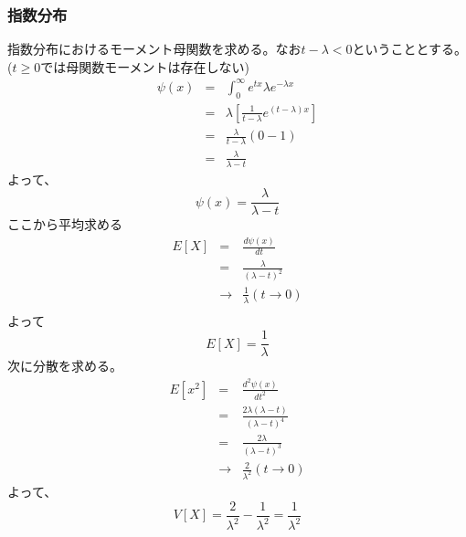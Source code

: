 \documentclass[a4paper,10pt]{jarticle}
\begin{document}
\subsubsection{指数分布}

指数分布におけるモーメント母関数を求める。なお$t-\lambda <0$ということとする。($t\geq 0$では母関数モーメントは存在しない)
\begin{eqnarray*}
    \psi(x) &=&\int_0^\infty e^{tx}\lambda e^{-\lambda x}\\
    &=& \lambda\left[\frac{1}{t-\lambda}e^{(t-\lambda)x}\right]\\
    &=& \frac{\lambda}{t-\lambda}(0-1)\\
    &=& \frac{\lambda}{\lambda - t}
\end{eqnarray*}
よって、
\begin{equation}
    \psi(x)  = \frac{\lambda}{\lambda - t}\tag{3,32}
\end{equation}
ここから平均求める
\begin{eqnarray*}
    E[X] &=& \frac{d\psi(x)}{dt}\\
    &=& \frac{\lambda}{(\lambda-t)^2}\\
    &\rightarrow&\frac{1}{\lambda}(t\rightarrow 0)\\
\end{eqnarray*}
よって
\begin{equation}
    E[X] = \frac{1}{\lambda}\tag{3,33}
\end{equation}
次に分散を求める。
\begin{eqnarray*}
    E[x^2] &=& \frac{d^2\psi(x)}{dt^2}\\
    &=& \frac{2\lambda(\lambda-t)}{(\lambda-t)^4}\\
    &=& \frac{2\lambda}{(\lambda-t)^3}\\
    &\rightarrow&\frac{2}{\lambda^2}(t\rightarrow 0)
\end{eqnarray*}
よって、
\begin{equation}
    V[X] = \frac{2}{\lambda^2}-\frac{1}{\lambda^2} =\frac{1}{\lambda^2}\tag{3,33}
\end{equation}
\end{document}
